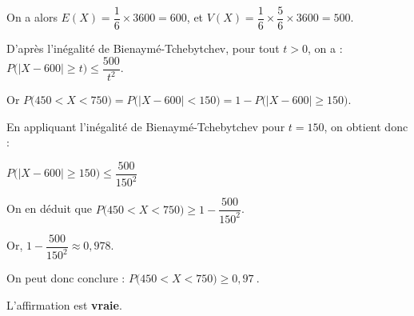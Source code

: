 \documentclass[10pt]{article}
\providecommand{\np}[2][]{{#2~#1}}
\begin{document}
\begin{enumerate}
		On a alors \quad $E(X)=\dfrac16 \times 3600 = 600$, \quad et \quad $V(X)=\dfrac16 \times \dfrac56 \times 3600=500$.

		D'après l'inégalité de Bienaymé-Tchebytchev, pour tout $t >0$, on a :\quad $P \bigg( \big\vert X-600 \big\vert \geqslant t \bigg) \leqslant \dfrac{500}{t^2}$.

		Or \quad $P \bigg( 450 < X < 750 \bigg) = P \bigg( \big\vert X-600 \big\vert < 150 \bigg) =1- P \bigg( \big\vert X-600 \big\vert \geqslant 150 \bigg)$.

		En appliquant l'inégalité de Bienaymé-Tchebytchev pour $t=150$, on obtient donc :

		$P \bigg( \big\vert X-600 \big\vert \geqslant 150 \bigg) \leqslant \dfrac{500}{150^2}$

		On en déduit que \quad $P \bigg( 450 < X < 750 \bigg)  \geqslant 1-\dfrac{500}{150^2}$.

		Or, \quad $1-\dfrac{500}{150^2} \approx 0,978$.

		On peut donc conclure : \quad $P \bigg( 450 < X < 750 \bigg) \geqslant \np{0,97}$.

		L'affirmation est \textbf{vraie}.
	\end{enumerate}
\end{document}

